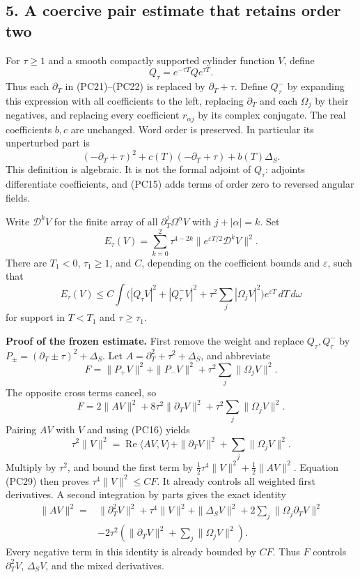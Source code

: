 \documentclass[
  11pt,
]{article}
\begin{document}
\subsection{5. A coercive pair estimate that retains order
two}\label{a-coercive-pair-estimate-that-retains-order-two}

For \(\tau\geq1\) and a smooth compactly supported cylinder function
\(V\), define \[
Q_\tau=e^{-\tau T}Qe^{\tau T}.
\tag{PC25}
\] Thus each \(\partial_T\) in (PC21)--(PC22) is replaced by
\(\partial_T+\tau\). Define \(Q_\tau^-\) by expanding this expression
with all coefficients to the left, replacing \(\partial_T\) and each
\(\Omega_j\) by their negatives, and replacing every coefficient
\(r_{\alpha j}\) by its complex conjugate. The real coefficients \(b,c\)
are unchanged. Word order is preserved. In particular its unperturbed
part is \[
( -\partial_T+\tau)^2+c(T)(-\partial_T+\tau)+b(T)\Delta_S.
\tag{PC26}
\] This definition is algebraic. It is not the formal adjoint of
\(Q_\tau\): adjoints differentiate coefficients, and (PC15) adds terms
of order zero to reversed angular fields.

Write \(\mathscr D^kV\) for the finite array of all
\(\partial_T^j\Omega^\alpha V\) with \(j+|\alpha|=k\). Set \[
E_\tau(V)=\sum_{k=0}^2\tau^{4-2k}
     \|e^{\varepsilon T/2}\mathscr D^kV\|^2.
\tag{PC27}
\] There are \(T_1<0\), \(\tau_1\geq1\), and \(C\), depending on the
coefficient bounds and \(\varepsilon\), such that \[
E_\tau(V)\leq C\int
 \bigl(|Q_\tau V|^2+|Q_\tau^-V|^2
                  +\tau^2\sum_j|\Omega_jV|^2\bigr)e^{\varepsilon T}
 \,dT\,d\omega
\tag{PC28}
\] for support in \(T<T_1\) and \(\tau\geq\tau_1\).

\textbf{Proof of the frozen estimate.} First remove the weight and
replace \(Q_\tau,Q_\tau^-\) by \(P_\pm=(\partial_T\pm\tau)^2+\Delta_S\).
Let \(A=\partial_T^2+\tau^2+\Delta_S\), and abbreviate \[
F=\|P_+V\|^2+\|P_-V\|^2
                 +\tau^2\sum_j\|\Omega_jV\|^2.
\] The opposite cross terms cancel, so \[
F=2\|AV\|^2+8\tau^2\|\partial_TV\|^2
                  +\tau^2\sum_j\|\Omega_jV\|^2.
\tag{PC29}
\] Pairing \(AV\) with \(V\) and using (PC16) yields \[
\tau^2\|V\|^2
=\operatorname{Re}\langle AV,V\rangle
 +\|\partial_TV\|^2+\sum_j\|\Omega_jV\|^2.
\] Multiply by \(\tau^2\), and bound the first term by
\(\tfrac12\tau^4\|V\|^2+\tfrac12\|AV\|^2\). Equation (PC29) then proves
\(\tau^4\|V\|^2\leq CF\). It already controls all weighted first
derivatives. A second integration by parts gives the exact identity \[
\begin{split}
\|AV\|^2={}&\|\partial_T^2V\|^2+\tau^4\|V\|^2
 +\|\Delta_SV\|^2+2\sum_j\|\Omega_j\partial_TV\|^2\\
 &-2\tau^2\left(\|\partial_TV\|^2
                         +\sum_j\|\Omega_jV\|^2\right).
\end{split}
\tag{PC30}
\] Every negative term in this identity is already bounded by \(CF\).
Thus \(F\) controls \(\partial_T^2V\), \(\Delta_SV\), and the mixed
derivatives.
\end{document}
